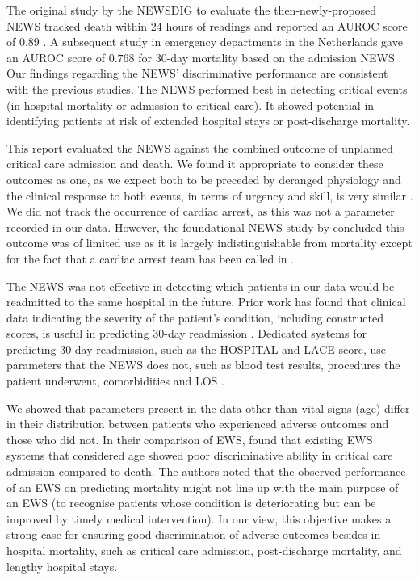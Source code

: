 \documentclass[10pt,journal, compsoc]{IEEEtran}
\begin{document}
The original study by the NEWSDIG to evaluate the then-newly-proposed NEWS tracked death within 24 hours of readings and reported an AUROC score of $0.89$ \cite{Smith13}. A subsequent study in emergency departments in the Netherlands gave an AUROC score of $0.768$ for 30-day mortality based on the admission NEWS \cite{Alam15}. Our findings regarding the NEWS' discriminative performance are consistent with the previous studies. The NEWS performed best in detecting critical events (in-hospital mortality or admission to critical care). It showed potential in identifying patients at risk of extended hospital stays or post-discharge mortality.

This report evaluated the NEWS against the combined outcome of unplanned critical care admission and death. We found it appropriate to consider these outcomes as one, as we expect both to be preceded by deranged physiology and the clinical response to both events, in terms of urgency and skill, is very similar \cite[pp.~4]{Smith13}. We did not track the occurrence of cardiac arrest, as this was not a parameter recorded in our data. However, the foundational NEWS study by \cite{Smith13} concluded this outcome was of limited use as it is largely indistinguishable from mortality except for the fact that a cardiac arrest team has been called in \cite[pp.~4]{Smith13}.

The NEWS was not effective in detecting which patients in our data would be readmitted to the same hospital in the future. Prior work has found that clinical data indicating the severity of the patient's condition, including constructed scores, is useful in predicting 30-day readmission \cite[pp.~5]{Mahmoudi20}. Dedicated systems for predicting 30-day readmission, such as the HOSPITAL and LACE score, use parameters that the NEWS does not, such as blood test results, procedures the patient underwent, comorbidities and LOS \cite{Donze13}.

We showed that parameters present in the data other than vital signs (age) differ in their distribution between patients who experienced adverse outcomes and those who did not. In their comparison of EWS, \cite{Smith13} found that existing EWS systems that considered age showed poor discriminative ability in critical care admission compared to death. The authors noted that the observed performance of an EWS on predicting mortality might not line up with the main purpose of an EWS (to recognise patients whose condition is deteriorating but can be improved by timely medical intervention). In our view, this objective makes a strong case for ensuring good discrimination of adverse outcomes besides in-hospital mortality, such as critical care admission, post-discharge mortality, and lengthy hospital stays.
\end{document}
